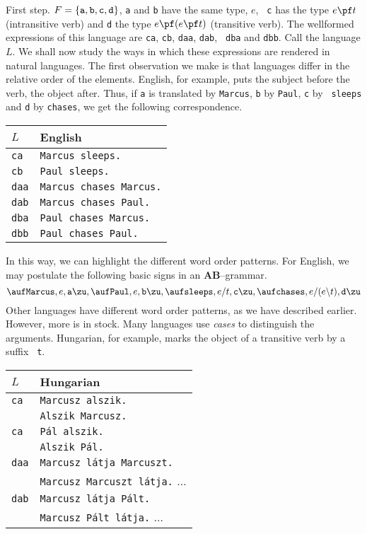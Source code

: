 First step. $F = \{\mbox{\tt a}, \mbox{\tt b}, \mbox{\tt c},
\mbox{\tt d}\}$, {\tt a} and {\tt b} have the same type, $e$, {\tt
c} has the type $e \pf t$ (intransitive verb) and {\tt d} the type
$e \pf (e \pf t)$ (transitive verb). The wellformed expressions of
this language are {\tt ca}, {\tt cb}, {\tt daa}, {\tt dab}, {\tt
dba} and {\tt dbb}. Call the language $L$. We shall now study the
ways in which these expressions are rendered in natural languages.
The first observation we make is that languages differ in the
relative order of the elements. English, for example, puts the
subject before the verb, the object after. Thus, if {\tt a} is
translated by {\tt Marcus}, {\tt b} by {\tt Paul}, {\tt c} by {\tt
sleeps} and {\tt d} by {\tt chases}, we get the following
correspondence.
\begin{center}
\begin{tabular}{l|l}
$L$ & English \\\hline
{\tt ca} & {\tt Marcus sleeps.} \\
{\tt cb} & {\tt Paul sleeps.} \\
{\tt daa} & {\tt Marcus chases Marcus.} \\
{\tt dab} & {\tt Marcus chases Paul.} \\
{\tt dba} & {\tt Paul chases Marcus.} \\
{\tt dbb} & {\tt Paul chases Paul.}
\end{tabular}
\end{center}
In this way, we can highlight the different word order patterns.
For English, we may postulate the following basic signs in an {\bf
AB}--grammar.
$$\auf \mbox{\tt Marcus}, e, \mbox{\tt a}\zu,
\auf \mbox{\tt Paul}, e, \mbox{\tt b}\zu, \auf \mbox{\tt sleeps},
e/t, \mbox{\tt c}\zu, \auf \mbox{\tt chases}, e/(e \backslash t),
\mbox{\tt d}\zu$$
Other languages have different word order patterns, as we have
described earlier. However, more is in stock. Many languages use
{\it cases\/} to distinguish the arguments. Hungarian, for
example, marks the object of a transitive verb by a suffix {\tt
t}.
\begin{center}
\begin{tabular}{l|l}
$L$ & Hungarian \\\hline
{\tt ca} & {\tt Marcusz alszik.} \\
         & {\tt Alszik Marcusz.} \\
{\tt ca} & {\tt P\'al alszik.} \\
         & {\tt Alszik P\'al.} \\
{\tt daa} & {\tt Marcusz l\'atja Marcuszt.} \\
          & {\tt Marcusz Marcuszt l\'atja.} $\ldots$ \\
{\tt dab} & {\tt Marcusz l\'atja P\'alt.} \\
          & {\tt Marcusz P\'alt l\'atja.} $\ldots$
\end{tabular}
\end{center}

